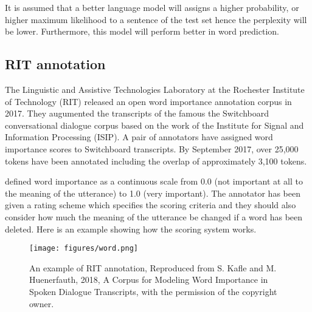 It is assumed that a better language model will assigns a higher probability, or higher maximum likelihood to a sentence of the test set hence the perplexity will be lower. Furthermore, this model will perform better in word prediction.

\subsection{RIT annotation}
The Linguistic and Assistive Technologies Laboratory at the Rochester Institute of Technology (RIT) released an open word importance annotation corpus in 2017. They augumented the transcripts of the famous the Switchboard conversational dialogue corpus \citep{Godfrey1992} based on the work of the Institute for Signal and Information Processing (ISIP). A pair of annotators have assigned word importance scores to Switchboard transcripts. By September 2017, over 25,000 tokens have been annotated including the overlap of approximately 3,100 tokens. 

\citet{Kafle2018} defined word importance as a continuous scale from 0.0 (not important
at all to the meaning of the utterance) to 1.0 (very important). The annotator has been given a rating scheme which specifies the scoring criteria and they should also consider how much the meaning of the utterance be changed if a word has been deleted. Here is an example showing how the scoring system works.

\begin{figure}[ht]
\texttt{[image: figures/word.png]}
\caption{An example of RIT annotation, Reproduced from S. Kafle and M. Huenerfauth, 2018, A Corpus for Modeling Word Importance in Spoken Dialogue Transcripts, with the permission of the copyright owner.}
\label{fig:word}
\end{figure}



%
%


